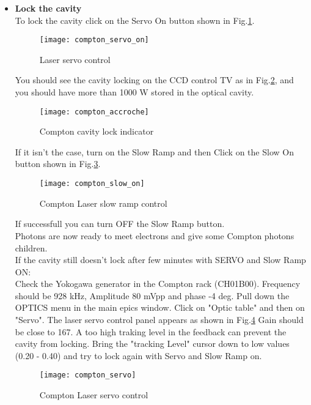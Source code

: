 {\begin{itemize}
\item {\bf Lock the cavity}\\
	
 To lock the cavity click on the Servo On button shown in Fig.\ref{fig:compton_servo_on}.
 \begin{figure}[htp]
    \begin{center}
        \texttt{[image: compton\_servo\_on]}
    \end{center}
    \caption[compton:servo control]{Laser servo control}
    \label{fig:compton_servo_on}
 \end{figure}
You should see the cavity locking
on the CCD control TV as in  Fig.\ref{fig:compton_accroche}, and you should have more than 1000 W stored
in the optical cavity.
\begin{figure}[htp]
    \begin{center}
        \texttt{[image: compton\_accroche]}
    \end{center}
    \caption[compton:vacity lock]{Compton cavity lock indicator}
    \label{fig:compton_accroche}
\end{figure}

If it isn't the case, turn on the Slow Ramp and then Click on the Slow On button shown in 
Fig.\ref{fig:compton_slow_on}.
\begin{figure}[htp]
    \begin{center}
        \texttt{[image: compton\_slow\_on]}
    \end{center}
    \caption[compton:laser ramp control]{Compton Laser slow ramp control}
    \label{fig:compton_slow_on}
\end{figure}

    If successfull you can turn OFF the Slow Ramp button.\\
    Photons are now ready to meet electrons and give some Compton photons children.\\

    If the cavity still doesn't lock after few minutes with SERVO and Slow Ramp ON:\\
Check the Yokogawa generator in the Compton rack (CH01B00).
Frequency should be 928 kHz, Amplitude 80 mVpp and phase -4 deg.
Pull down the OPTICS menu in the main epics window. Click on "Optic table" and then on "Servo".
The laser servo control panel appears as shown in Fig.\ref{fig:compton_servo}
Gain should be close to 167. A too high traking level in the feedback can prevent the
cavity from locking. Bring the "tracking Level" cursor down to low values (0.20 - 0.40)
and try to lock again with Servo and Slow Ramp on.
\begin{figure}[htp]
    \begin{center}
        \texttt{[image: compton\_servo]}
    \end{center}
    \caption[compton:servo settings]{Compton Laser servo control}
    \label{fig:compton_servo}
\end{figure}


\end{itemize}}
